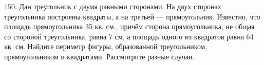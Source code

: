 150. Дан треугольник с двумя равными сторонами. На двух сторонах треугольника построены квадраты, а на третьей --- прямоугольник. Известно, что площадь прямоугольника 35 кв. см., причём сторона прямоугольника, не общая со стороной треугольника, равна 7 см, а площадь одного из квадратов равна 64 кв. см. Найдите периметр фигуры, образованной треугольником, прямоугольником и квадратами. Рассмотрите разные случаи.\\
